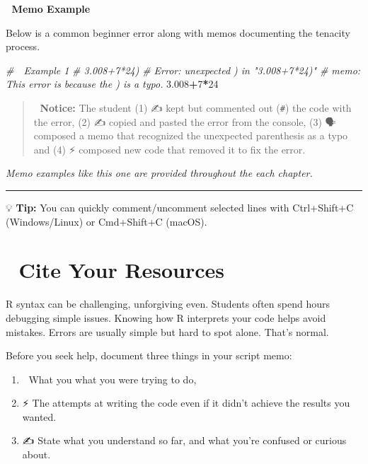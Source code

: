 \documentclass[
  12pt,
]{scrreprt}
\newenvironment{Shaded}{\begin{snugshade}}{\end{snugshade}}
\newcommand{\CommentTok}[1]{\textcolor[rgb]{0.56,0.35,0.01}{\textit{#1}}}
\newcommand{\DecValTok}[1]{\textcolor[rgb]{0.00,0.00,0.81}{#1}}
\newcommand{\FloatTok}[1]{\textcolor[rgb]{0.00,0.00,0.81}{#1}}
\newcommand{\SpecialCharTok}[1]{\textcolor[rgb]{0.81,0.36,0.00}{\textbf{#1}}}
\begin{document}
🧩 \textbf{Memo Example}

Below is a common beginner error along with memos documenting the
tenacity process.

\begin{Shaded}
\begin{Highlighting}[]
\CommentTok{\# 🧩 Example 1}
\CommentTok{\# 3.008+7*24)}
\CommentTok{\# Error: unexpected \textquotesingle{})\textquotesingle{} in "3.008+7*24)"}
\CommentTok{\# memo: This error is because the ) is a typo. }
\FloatTok{3.008}\SpecialCharTok{+}\DecValTok{7}\SpecialCharTok{*}\DecValTok{24}
\end{Highlighting}
\end{Shaded}

\begin{quote}
🧐 \textbf{Notice:} The student (1) ✍️ kept but commented out
(\texttt{\#}) the code with the error, (2) ✍️ copied and pasted the
error from the console, (3) 🗣 composed a memo that recognized the
unexpected parenthesis as a typo and (4) ⚡ composed new code that
removed it to fix the error.
\end{quote}

\emph{Memo examples like this one are provided throughout the each
chapter.}

\begin{center}\rule{0.5\linewidth}{0.5pt}\end{center}

💡 \textbf{Tip:} You can quickly comment/uncomment selected lines with
Ctrl+Shift+C (Windows/Linux) or Cmd+Shift+C (macOS).

\section{👀 Cite Your Resources}\label{cite-your-resources}

R syntax can be challenging, unforgiving even. Students often spend
hours debugging simple issues. Knowing how R interprets your code helps
avoid mistakes. Errors are usually simple but hard to spot alone. That's
normal.

Before you seek help, document three things in your script memo:

\begin{enumerate}
\def\labelenumi{\arabic{enumi}.}
\item
  🎯 What you what you were trying to do,
\item
  ⚡ The attempts at writing the code️ even if it didn't achieve the
  results you wanted.
\item
  ✍ State what you understand so far, and what you're confused or
  curious about.
\end{enumerate}
\end{document}
